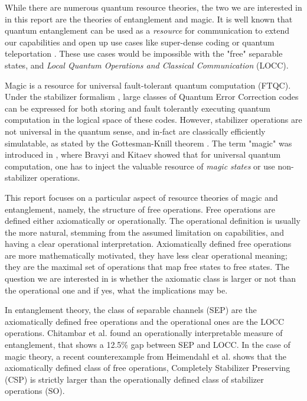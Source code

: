 While there are numerous quantum resource theories, the two we are interested in in this report are the theories of entanglement and magic. It is well known that quantum entanglement can be used as a \textit{resource} for communication to extend our capabilities and open up use cases like super-dense coding or quantum teleportation \cite{wilde_quantum_2017}. These use cases would be impossible with the "free" separable states, and \textit{Local Quantum Operations and Classical Communication} (LOCC). 

Magic is a resource for universal fault-tolerant quantum computation (FTQC). Under the stabilizer formalism \cite{gottesman_stabilizer_1997}, large classes of Quantum Error Correction codes can be expressed for both storing and fault tolerantly executing quantum computation in the logical space of these codes. However, stabilizer operations are not universal in the quantum sense, and in-fact are classically efficiently simulatable, as stated by the Gottesman-Knill theorem \cite{gottesman_stabilizer_1997, aaronson_improved_2004}. The term "magic" was introduced in \cite{bravyi_universal_2005}, where Bravyi and Kitaev showed that for universal quantum computation, one has to inject the valuable resource of \textit{magic states} or use non-stabilizer operations.

This report focuses on a particular aspect of resource theories of magic and entanglement, namely, the structure of free operations. Free operations are defined either axiomatically or operationally. The operational definition is usually the more natural, stemming from the assumed limitation on capabilities, and having a clear operational interpretation. Axiomatically defined free operations are more mathematically motivated, they have less clear operational meaning; they are the maximal set of operations that map free states to free states. The question we are interested in is whether the axiomatic class is larger or not than the operational one and if yes, what the implications may be. 

In entanglement theory, the class of separable channels (SEP) are the axiomatically defined free operations and the operational ones are the LOCC operations. Chitambar et al. \cite{chitambar_increasing_2012} found an operationally interpretable measure of entanglement, that shows a 12.5\% gap between SEP and LOCC. In the case of magic theory, a recent counterexample from Heimendahl et al. \cite{heimendahl_axiomatic_2022} shows that the axiomatically defined class of free operations, Completely Stabilizer Preserving (CSP) is strictly larger than the operationally defined class of stabilizer operations (SO). 

